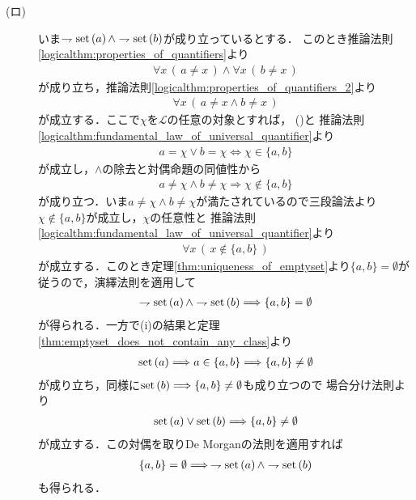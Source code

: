 \begin{prf}
\begin{description}
			\item[(ロ)]
				いま$\rightharpoondown \operatorname*{set} \left(a\right) \wedge \rightharpoondown \operatorname*{set} \left(b\right)$が成り立っているとする．
				このとき推論法則\ref{logicalthm:properties_of_quantifiers}より
				\begin{align}
					\forall x\, (\, a \neq x\, ) \wedge \forall x\, (\, b \neq x\, )
				\end{align}
				が成り立ち，推論法則\ref{logicalthm:properties_of_quantifiers_2}より
				\begin{align}
					\forall x\, (\, a \neq x \wedge b \neq x\, )
				\end{align}
				が成立する．ここで$\chi$を$\mathcal{L}$の任意の対象とすれば，
				()と
				推論法則\ref{logicalthm:fundamental_law_of_universal_quantifier}より
				\begin{align}
					a = \chi \vee b = \chi \Longleftrightarrow \chi \in \{a,b\}
				\end{align}
				が成立し，$\wedge$の除去と対偶命題の同値性から
				\begin{align}
					a \neq \chi \wedge b \neq \chi \Longrightarrow \chi \notin \{a,b\}
				\end{align}
				が成り立つ．いま$a \neq \chi \wedge b \neq \chi$が満たされているので三段論法より
				$\chi \notin \{a,b\}$が成立し，$\chi$の任意性と
				推論法則\ref{logicalthm:fundamental_law_of_universal_quantifier}より
				\begin{align}
					\forall x\, (\, x \notin \{a,b\}\, )
				\end{align}
				が成立する．このとき定理\ref{thm:uniqueness_of_emptyset}より$\{a,b\} = \emptyset$が従うので，演繹法則を適用して
				\begin{align}
					\rightharpoondown \operatorname*{set} \left(a\right) \wedge \rightharpoondown \operatorname*{set} \left(b\right) \Longrightarrow \{a,b\} = \emptyset
				\end{align}
				が得られる．一方で(i)の結果と定理\ref{thm:emptyset_does_not_contain_any_class}より
				\begin{align}
					\operatorname*{set} \left(a\right) \Longrightarrow a \in \{a,b\} \Longrightarrow \{a,b\} \neq \emptyset
				\end{align}
				が成り立ち，同様に$\operatorname*{set} \left(b\right) \Longrightarrow \{a,b\} \neq \emptyset$も成り立つので
				場合分け法則より
				\begin{align}
					\operatorname*{set} \left(a\right) \vee \operatorname*{set} \left(b\right) \Longrightarrow \{a,b\} \neq \emptyset
				\end{align}
				が成立する．この対偶を取りDe Morganの法則を適用すれば
				\begin{align}
					\{a,b\} = \emptyset \Longrightarrow\, \rightharpoondown \operatorname*{set} \left(a\right) \wedge \rightharpoondown \operatorname*{set} \left(b\right)
				\end{align}
				も得られる．
				\QED
		\end{description}
	\end{prf}
	
